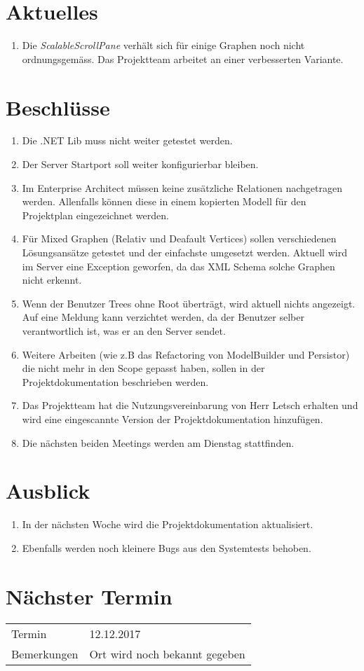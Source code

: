 \documentclass[11pt, a4paper,oneside]{scrartcl}
\begin{document}
	\section{Aktuelles}
		\begin{enumerate}
		\item Die \textit{ScalableScrollPane} verhält sich für einige Graphen noch nicht ordnungsgemäss. Das Projektteam arbeitet an einer verbesserten Variante.
	\end{enumerate} 
	
	\section{Beschlüsse}
	\begin{enumerate}
		\item Die .NET Lib muss nicht weiter getestet werden.
		\item Der Server Startport soll weiter konfigurierbar bleiben.
		\item Im Enterprise Architect müssen keine zusätzliche Relationen nachgetragen werden. Allenfalls können diese in einem kopierten Modell für den Projektplan eingezeichnet werden.
		\item Für Mixed Graphen (Relativ und Deafault Vertices) sollen verschiedenen Lösungsansätze getestet und der einfachste umgesetzt werden. Aktuell wird im Server eine Exception geworfen, da das XML Schema solche Graphen nicht erkennt.
		\item Wenn der Benutzer Trees ohne Root überträgt, wird aktuell nichts angezeigt. Auf eine Meldung kann verzichtet werden, da der Benutzer selber verantwortlich ist, was er an den Server sendet.
		\item Weitere Arbeiten (wie z.B das Refactoring von ModelBuilder und Persistor) die nicht mehr in den Scope gepasst haben, sollen in der Projektdokumentation beschrieben werden.
		\item Das Projektteam hat die Nutzungsvereinbarung von Herr Letsch erhalten und wird eine eingescannte Version der Projektdokumentation hinzufügen.
		\item Die nächsten beiden Meetings werden am Dienstag stattfinden.
	\end{enumerate}

	\section{Ausblick}
	\begin{enumerate}
		\item In der nächsten Woche wird die Projektdokumentation aktualisiert. 
		\item Ebenfalls werden noch kleinere Bugs aus den Systemtests behoben.
	\end{enumerate}
	
	\section{Nächster Termin}
	\begin{tabu} to \linewidth {l X }
		\toprule
		Termin & 12.12.2017  \\
		Bemerkungen & Ort wird noch bekannt gegeben  \\
		\bottomrule
	\end{tabu}
	
\end{document}
